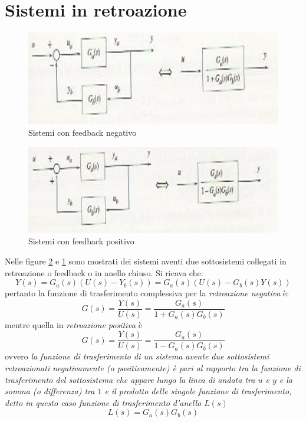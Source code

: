\documentclass[a4paper]{report}
\begin{document}
\section{Sistemi in retroazione}
\begin{figure}[!h]
  \begin{center}
    \includegraphics[scale=0.5]{./figures/feedbackneg.png}
    \caption{Sistemi con feedback negativo}\label{fig:sysnegfed}
  \end{center}
\end{figure}
\begin{figure}[!h]
  \begin{center}
    \includegraphics[scale=0.5]{./figures/feedbackpos.png}
    \caption{Sistemi con feedback positivo}\label{fig:sysposfed}
  \end{center}
\end{figure} 
Nelle figure \ref{fig:sysposfed} e \ref{fig:sysnegfed} sono mostrati
dei sistemi aventi due sottosistemi collegati in retroazione o
feedback o in anello chiuso.
Si ricava che:
\begin{equation}
  Y(s) = G_a(s)(U(s) - Y_b(s)) = G_a(s)(U(s) - G_b(s)Y(s))
\end{equation}
pertanto la funzione di trasferimento complessiva per la
\emph{retroazione negativa} \`e:
\begin{equation}
  G(s) = \dfrac{Y(s)}{U(s)} = \dfrac{G_a(s)}{1 + G_a(s)G_b(s)}
\end{equation}
mentre quella in \emph{retroazione positiva} \`e
\begin{equation}
  G(s)=\dfrac{Y(s)}{U(s)} = \dfrac{G_a(s)}{1 - G_a(s)G_b(s)}
\end{equation}
ovvero \emph{la funzione di trasferimento di un sistema avente due
  sottosistemi retroazionati negativamente (o positivamente) \`e pari al
  rapporto tra la funzione di trasferimento del sottosistema che
  appare lungo la linea di andata tra $u$ e $y$ e la somma (o
  differenza) tra $1$ e il prodotto delle singole funzione di
  trasferimento, detto in questo caso funzione di trasferimento
  d'anello $L(s)$} 
\begin{equation}
  L(s)=G_a(s)G_b(s)
\end{equation}
\end{document}
